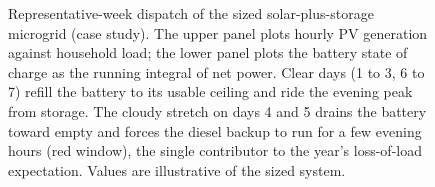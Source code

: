\begin{figure}[htbp]
\caption[Microgrid dispatch over a representative week]{Representative-week
dispatch of the sized solar-plus-storage microgrid (case study). The upper
panel plots hourly PV generation against household load; the lower panel
plots the battery state of charge as the running integral of net power.
Clear days (1 to 3, 6 to 7) refill the battery to its usable ceiling and
ride the evening peak from storage. The cloudy stretch on days 4 and 5
drains the battery toward empty and forces the diesel backup to run for a
few evening hours (red window), the single contributor to the year's
loss-of-load expectation. Values are illustrative of the sized system.}
\label{fig:vol04ch14:microgrid-week}
\end{figure}
